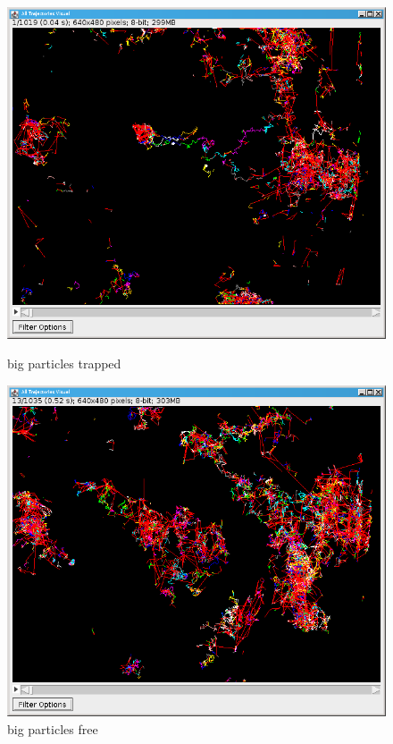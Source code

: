 \documentclass[a4paper,12pt,twoside]{article}	%
\begin{document}
\begin{figure}
\centering
\begin{minipage}{.5\textwidth}
	\centering
	\includegraphics[width=.95\linewidth]{./figures/traj_gros_trap}
	\caption{big particles trapped}
	\label{fig:test1}
\end{minipage}%
\begin{minipage}{.5\textwidth}
	\centering
	\includegraphics[width=.95\linewidth]{./figures/traj_gros_free}
	\caption{big particles free}
	\label{fig:test2}
\end{minipage}
\end{figure}
\end{document}

